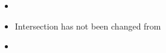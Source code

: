 \begin{itemize}

    \item


\item
Intersection has not been changed from \cite{Eugene2001}

\item
\bracket[]

\end{itemize}